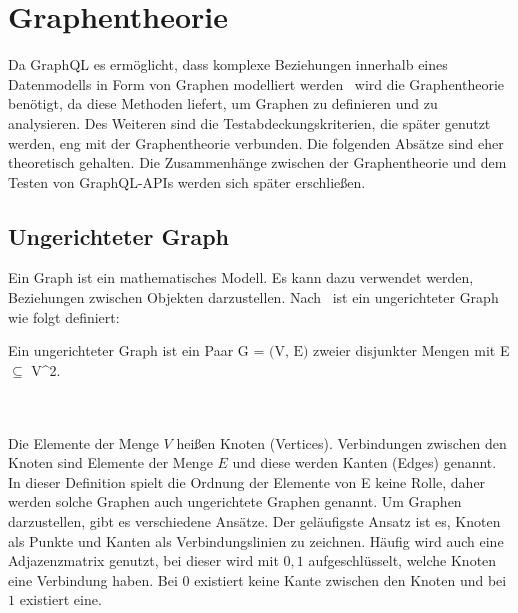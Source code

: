 \section{Graphentheorie}
\label{sec:graphentheorie}

Da GraphQL es ermöglicht, dass komplexe Beziehungen innerhalb eines Datenmodells in Form von Graphen modelliert werden~\cite[vgl. Modelling with Graph(QL)]{graphqlgraphtheory}
wird die Graphentheorie benötigt, da diese Methoden liefert, um Graphen zu definieren und zu analysieren.
Des Weiteren sind die Testabdeckungskriterien, die später genutzt werden, eng mit der Graphentheorie verbunden.
Die folgenden Absätze sind eher theoretisch gehalten.
Die Zusammenhänge zwischen der Graphentheorie und dem Testen von GraphQL-APIs werden sich später erschließen.

\subsection{Ungerichteter Graph}

Ein Graph ist ein mathematisches Modell.
Es kann dazu verwendet werden, Beziehungen zwischen Objekten darzustellen.
Nach~\cite{graphentheorie} ist ein ungerichteter Graph wie folgt definiert:

\begin{definition}
    Ein ungerichteter Graph ist ein Paar $\textrm{G = (V, E)}$ zweier disjunkter Mengen mit E $\subseteq$ V^2.
    \label{graphdef}
\end{definition}\cite[ vgl. S.2 0.1 Graphen]{graphentheorie}
\\
\\
Die Elemente der Menge $V$ heißen Knoten (Vertices).
Verbindungen zwischen den Knoten sind Elemente der Menge $E$ und diese werden Kanten (Edges) genannt.
In dieser Definition spielt die Ordnung der Elemente von E keine Rolle, daher werden solche Graphen auch ungerichtete Graphen genannt.
Um Graphen darzustellen, gibt es verschiedene Ansätze.
Der geläufigste Ansatz ist es, Knoten als Punkte und Kanten als Verbindungslinien zu zeichnen.
Häufig wird auch eine Adjazenzmatrix genutzt, bei dieser wird mit $0,1$ aufgeschlüsselt, welche Knoten eine Verbindung haben.
Bei $0$ existiert keine Kante zwischen den Knoten und bei $1$ existiert eine.

